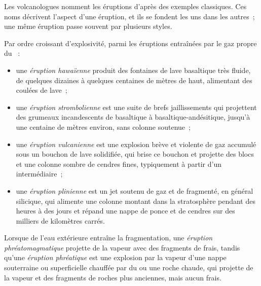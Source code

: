 Les volcanologues nomment les éruptions d'après des exemples classiques. Ces noms décrivent l'aspect
d'une éruption, et ils se fondent les uns dans les autres~; une même éruption passe souvent
par plusieurs styles.

\begin{definition}\label{def:b2:eruptive-styles:styles}
Par ordre croissant d'explosivité, parmi les éruptions entraînées par le gaz propre du ~:
\begin{itemize}
\item une \emph{éruption hawaïenne} produit des fontaines de
lave basaltique très fluide, de quelques dizaines à quelques centaines de mètres de haut, alimentant des coulées de lave~;
\item une \emph{éruption strombolienne} est une suite
de brefs jaillissements qui projettent des grumeaux incandescents de 
basaltique à basaltique-andésitique, jusqu'à une centaine de mètres environ,
sans colonne soutenue~;
\item une \emph{éruption vulcanienne} est une explosion brève et violente
de gaz accumulé sous un bouchon de lave solidifiée, qui brise ce bouchon et projette des blocs
et une colonne sombre de cendres fines, typiquement à partir d'un 
intermédiaire~;
\item une \emph{éruption plinienne} est un jet soutenu de gaz
et de  fragmenté, en général silicique, qui alimente une colonne montant dans la
stratosphère pendant des heures à des jours et répand une nappe de ponce et de cendres sur
des milliers de kilomètres carrés.
\end{itemize}
Lorsque de l'eau extérieure entraîne la fragmentation, une \emph{éruption
phréatomagmatique} projette de la vapeur avec des fragments
de  frais, tandis qu'une \emph{éruption phréatique} est une
explosion par la vapeur d'une nappe souterraine ou superficielle chauffée par du  ou une roche chaude,
qui projette de la vapeur et des fragments de roches plus anciennes, mais aucun  frais.
\end{definition}

